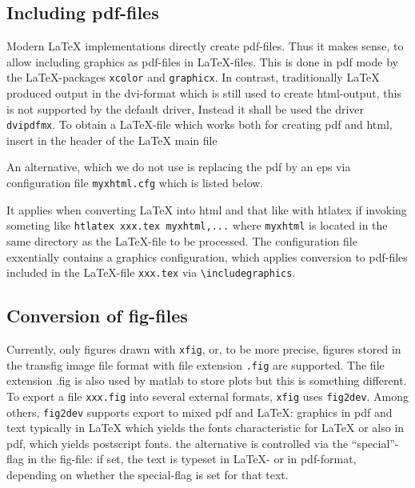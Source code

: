 \documentclass[12pt]{article}
\begin{document}
\subsection{Including pdf-files}\label{subsec:figpdf}

Modern \LaTeX{} implementations directly create pdf-files. 
Thus it makes sense, to allow including graphics as pdf-files 
in \LaTeX-files. 
This is done in pdf mode 
by the \LaTeX-packages {\tt xcolor} and {\tt graphicx}. 
In contrast, traditionally \LaTeX{} produced output in the \gls{dvi}-format 
which is still used to create \gls{html}-output, 
this is not supported by the default driver, 
Instead it shall be used the driver {\tt dvipdfmx}. 
To obtain a \LaTeX-file which works both for creating pdf and html, 
insert in the header of the \LaTeX{} main file 
%
\lstset{language=tex, basicstyle=\small}


An alternative, which we do not use 
is replacing the pdf by an \gls{eps} via configuration file {\tt myxhtml.cfg} 
which is listed below. 
%
\lstset{language=tex, basicstyle=\scriptsize}

%
It applies when converting \LaTeX{} into html and that like 
with htlatex if invoking someting like {\tt htlatex xxx.tex myxhtml,...} 
where {\tt myxhtml} is located in the same directory as the \LaTeX-file 
to be processed. 
The configuration file exxentially contains a graphics configuration, 
which applies conversion to pdf-files included in the \LaTeX-file {\tt xxx.tex}
via {\tt \textbackslash includegraphics}. 


\subsection{Conversion of fig-files}\label{subsec:fig2dev}

Currently, only figures drawn with {\tt xfig}, or, to be more precise, 
figures stored in the transfig image file format 
with file extension {\tt .fig} are supported. 
The file extension .fig is also used by matlab to store plots 
but this is something different. 
To export a file {\tt xxx.fig} into several external formats, 
{\tt xfig} uses {\tt fig2dev}. 
Among others, {\tt fig2dev} supports export to mixed pdf and \LaTeX{}: 
graphics in pdf 
and text typically in \LaTeX{} which yields the fonts 
characteristic for \LaTeX{} or also in pdf, 
which yields postscript fonts. 
the alternative is controlled via the ``special''-flag in the fig-file: 
if set, the text is typeset in \LaTeX- or in pdf-format, 
depending on whether the special-flag is set for that text. 
\end{document}
